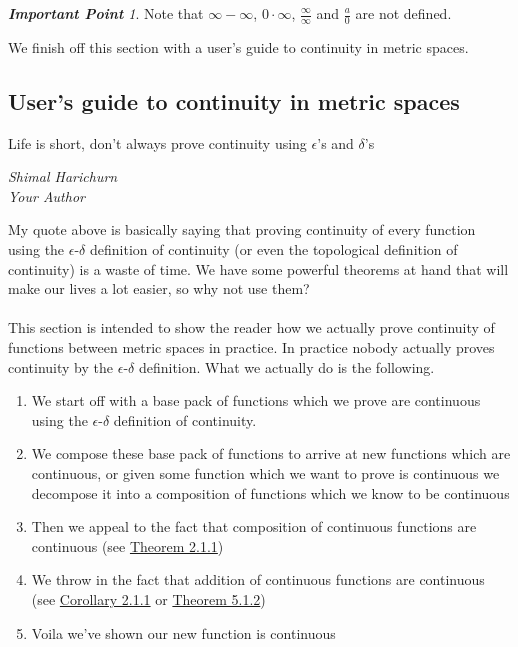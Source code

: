 \documentclass[12pt]{article}
\theoremstyle{definition}
\numberwithin{definition}{subsection}
\numberwithin{theorem}{subsection}
\numberwithin{corollary}{subsection}
\numberwithin{example}{subsection}
\theoremstyle{remark}
\theoremstyle{point}
\newtheorem*{point}{\textbf{Important Point}}
\begin{document}
	 \begin{point}
	 	Note that $\infty -\infty$, $0 \cdot \infty$, $\frac{\infty}{\infty}$ and $\frac{a}{0}$ are not defined.
	 \end{point}
	 
	 
	 We finish off this section with a user's guide to continuity in metric spaces.
	 
	 \newpage
	 \subsection{User's guide to continuity in metric spaces}
	 
	 \epigraph{Life is short, don't always prove continuity using $\epsilon$'s and $\delta$'s}{\textit{Shimal Harichurn \\ Your Author}}
	 
	 My quote above is basically saying that proving continuity of every function using the $\epsilon$-$\delta$ definition of continuity (or even the topological definition of continuity) is a waste of time. We have some powerful theorems at hand that will make our lives a lot easier, so why not use them?  \\ \\ This section is intended to show the reader how we actually prove continuity of functions between metric spaces in practice. In practice nobody actually proves continuity by the $\epsilon$-$\delta$ definition. What we actually do is the following.
	 
	 
	 \begin{enumerate}
	 	\item We start off with a base pack of functions which we prove are continuous using the  $\epsilon$-$\delta$ definition of continuity. 
	 	\item We compose these base pack of functions to arrive at new functions which are continuous, or given some function which we want to prove is continuous we decompose it into a composition of functions which we know to be continuous
	 	\item Then we appeal to the fact that composition of continuous functions are continuous (see \hyperlink{composition-continuity}{Theorem 2.1.1})
	 	\item We throw in the fact that addition of continuous functions are continuous (see \hyperlink{operations-cont}{Corollary 2.1.1} or \hyperlink{multi-operations-cont}{Theorem 5.1.2})
	 	\item Voila we've shown our new function is continuous
	 \end{enumerate}
	 
\end{document}
